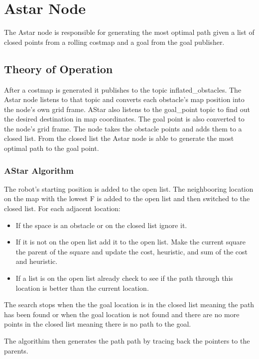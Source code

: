 \section{Astar Node}

The Astar node is responsible for generating the most optimal path given a list of closed points from a rolling costmap and a goal from the goal publisher.

\subsection{Theory of Operation}
After a costmap is generated it publishes to the topic inflated\_obstacles. The Astar node listens to that topic and converts each obstacle's map position into the node's own grid frame. AStar also listens to the goal\_point topic to find out the desired destination in map coordinates. The goal point is also converted to the node's grid frame. The node takes the obstacle points and adds them to a closed list. From the closed list the Astar node is able to generate the most optimal path to the goal point.


\subsubsection{AStar Algorithm}
The robot's starting position is added to the open list. The neighbooring location on the map with the lowest F is added to the open list and then switched to the closed list. For each adjacent location:

\begin{itemize} 
\item If the space is an obstacle or on the closed list ignore it.
\item If it is not on the open list add it to the open list. Make the current square the parent of the square and update the cost, heuristic, and sum of the cost and heuristic.
\item If a list is on the open list already check to see if the path through this location is better than the current location.
\end{itemize}

The search stops when the the goal location is in the closed list meaning the path has been found or when the goal location is not found and there are no more points in the closed list meaning there is no path to the goal.

The algorithim then generates the path path by tracing back the pointers to the parents.

